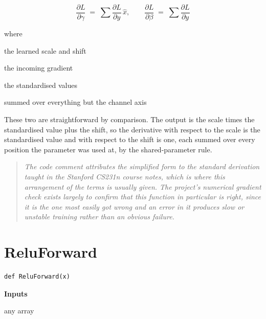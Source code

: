 \begin{equation}
\frac{\partial L}{\partial \gamma} \;=\; \sum \frac{\partial L}{\partial y} \, \hat{x}, \qquad \frac{\partial L}{\partial \beta} \;=\; \sum \frac{\partial L}{\partial y}
\end{equation}

\noindent where
\begin{description}[leftmargin=2.4em,style=nextline,font=\normalfont\ttfamily]\setlength\itemsep{1pt}
  \item[{$\gamma,\, \beta$}] \normalfont the learned scale and shift
  \item[{$\frac{\partial L}{\partial y}$}] \normalfont the incoming gradient
  \item[{$\hat{x}$}] \normalfont the standardised values
  \item[{$\sum$}] \normalfont summed over everything but the channel axis
\end{description}
These two are straightforward by comparison. The output is the scale times the standardised value plus the shift, so the derivative with respect to the scale is the standardised value and with respect to the shift is one, each summed over every position the parameter was used at, by the shared-parameter rule.


\begin{quote}\small\itshape The code comment attributes the simplified form to the standard derivation taught in the Stanford CS231n course notes, which is where this arrangement of the terms is usually given. The project's numerical gradient check exists largely to confirm that this function in particular is right, since it is the one most easily got wrong and an error in it produces slow or unstable training rather than an obvious failure.\end{quote}

\section{ReluForward}
\begin{lstlisting}[style=sig]
def ReluForward(x)
\end{lstlisting}

\noindent\textbf{Inputs}
\begin{description}[leftmargin=2.2em,style=nextline,font=\normalfont\ttfamily]\setlength\itemsep{1pt}
  \item[{x}] \normalfont any array
\end{description}

